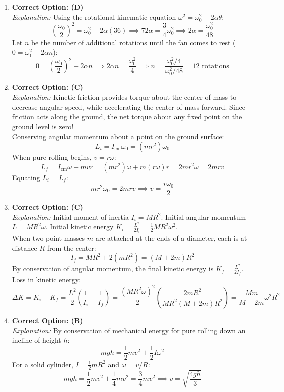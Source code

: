 \documentclass[11pt,a4paper]{article}
\begin{document}
\begin{enumerate}[label=\textbf{Q\arabic*.},leftmargin=24pt,itemsep=10pt]
  \item \textbf{Correct Option: (D)}\\
  \textit{Explanation:} Using the rotational kinematic equation $\omega^2 = \omega_0^2 - 2\alpha \theta$:
  \[
    \left(\frac{\omega_0}{2}\right)^2 = \omega_0^2 - 2\alpha (36) \implies 72 \alpha = \frac{3}{4} \omega_0^2 \implies 2\alpha = \frac{\omega_0^2}{48}
  \]
  Let $n$ be the number of additional rotations until the fan comes to rest ($0 = \omega_1^2 - 2\alpha n$):
  \[
    0 = \left(\frac{\omega_0}{2}\right)^2 - 2\alpha n \implies 2\alpha n = \frac{\omega_0^2}{4} \implies n = \frac{\omega_0^2/4}{\omega_0^2/48} = 12\text{ rotations}
  \]

  \item \textbf{Correct Option: (C)}\\
  \textit{Explanation:} Kinetic friction provides torque about the center of mass to decrease angular speed, while accelerating the center of mass forward. Since friction acts along the ground, the net torque about any fixed point on the ground level is zero!\\
  Conserving angular momentum about a point on the ground surface:
  \[
    L_i = I_{\text{cm}} \omega_0 = (m r^2) \omega_0
  \]
  When pure rolling begins, $v = r\omega$:
  \[
    L_f = I_{\text{cm}} \omega + m v r = (m r^2) \omega + m (r\omega) r = 2 m r^2 \omega = 2 m r v
  \]
  Equating $L_i = L_f$:
  \[
    m r^2 \omega_0 = 2 m r v \implies v = \frac{r \omega_0}{2}
  \]

  \item \textbf{Correct Option: (C)}\\
  \textit{Explanation:} Initial moment of inertia $I_i = M R^2$. Initial angular momentum $L = M R^2 \omega$. Initial kinetic energy $K_i = \frac{L^2}{2 I_i} = \frac{1}{2} M R^2 \omega^2$.\\
  When two point masses $m$ are attached at the ends of a diameter, each is at distance $R$ from the center:
  \[
    I_f = M R^2 + 2(m R^2) = (M + 2m) R^2
  \]
  By conservation of angular momentum, the final kinetic energy is $K_f = \frac{L^2}{2 I_f}$.\\
  Loss in kinetic energy:
  \[
    \Delta K = K_i - K_f = \frac{L^2}{2} \left( \frac{1}{I_i} - \frac{1}{I_f} \right) = \frac{(M R^2 \omega)^2}{2} \left( \frac{2m R^2}{M R^2 (M + 2m) R^2} \right) = \frac{M m}{M + 2m} \omega^2 R^2
  \]

  \item \textbf{Correct Option: (B)}\\
  \textit{Explanation:} By conservation of mechanical energy for pure rolling down an incline of height $h$:
  \[
    mgh = \frac{1}{2} m v^2 + \frac{1}{2} I \omega^2
  \]
  For a solid cylinder, $I = \frac{1}{2} m R^2$ and $\omega = v/R$:
  \[
    mgh = \frac{1}{2} m v^2 + \frac{1}{4} m v^2 = \frac{3}{4} m v^2 \implies v = \sqrt{\frac{4gh}{3}}
  \]


\end{enumerate}
\end{document}
